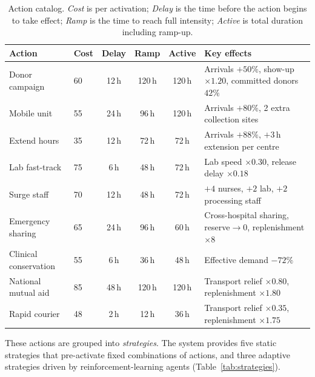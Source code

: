 \begin{table}[htbp]
\centering
\caption{Action catalog.  \emph{Cost} is per activation;
         \emph{Delay} is the time before the action begins to take effect;
         \emph{Ramp} is the time to reach full intensity;
         \emph{Active} is total duration including ramp-up.}
\label{tab:action-catalog}
\small
\begin{tabular}{@{}llcccp{5.2cm}@{}}
\toprule
\textbf{Action} & \textbf{Cost} & \textbf{Delay} & \textbf{Ramp}
                 & \textbf{Active} & \textbf{Key effects} \\
\midrule
Donor campaign         & 60  & 12\,h  & 120\,h & 120\,h
    & Arrivals $+50\%$, show-up $\times1.20$, committed donors $42\%$ \\
Mobile unit            & 55  & 24\,h  & 96\,h  & 120\,h
    & Arrivals $+80\%$, 2 extra collection sites \\
Extend hours           & 35  & 12\,h  & 72\,h  & 72\,h
    & Arrivals $+88\%$, $+3$\,h extension per centre \\
Lab fast-track         & 75  & 6\,h   & 48\,h  & 72\,h
    & Lab speed $\times0.30$, release delay $\times0.18$ \\
Surge staff            & 70  & 12\,h  & 48\,h  & 72\,h
    & $+4$ nurses, $+2$ lab, $+2$ processing staff \\
Emergency sharing      & 65  & 24\,h  & 96\,h  & 60\,h
    & Cross-hospital sharing, reserve$\to$0, replenishment $\times8$ \\
Clinical conservation  & 55  & 6\,h   & 36\,h  & 48\,h
    & Effective demand $-72\%$ \\
National mutual aid    & 85  & 48\,h  & 120\,h & 120\,h
    & Transport relief $\times0.80$, replenishment $\times1.80$ \\
Rapid courier          & 48  & 2\,h   & 12\,h  & 36\,h
    & Transport relief $\times0.35$, replenishment $\times1.75$ \\
\bottomrule
\end{tabular}
\end{table}

These actions are grouped into \emph{strategies}.  The system provides five
static strategies that pre-activate fixed combinations of actions, and three
adaptive strategies driven by reinforcement-learning agents
(Table~\ref{tab:strategies}).

